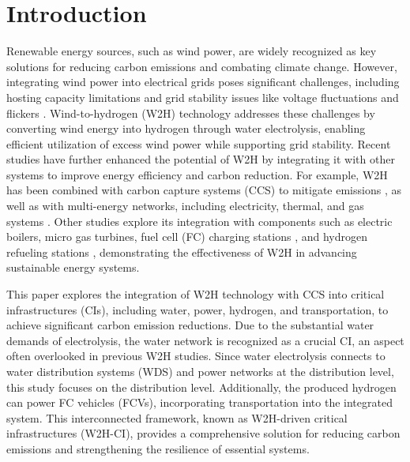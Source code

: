\documentclass[conference]{IEEEtran}
\begin{document}
\allowdisplaybreaks
\section{Introduction}   \label{sec: Intro}

Renewable energy sources, such as wind power, are widely recognized as key solutions for reducing carbon emissions and combating climate change. However, integrating wind power into electrical grids poses significant challenges, including hosting capacity limitations and grid stability issues like voltage fluctuations and flickers \cite{samet2020deep}. Wind-to-hydrogen (W2H) technology addresses these challenges by converting wind energy into hydrogen through water electrolysis, enabling efficient utilization of excess wind power while supporting grid stability. Recent studies have further enhanced the potential of W2H by integrating it with other systems to improve energy efficiency and carbon reduction. For example, W2H has been combined with carbon capture systems (CCS) to mitigate emissions \cite{samani2023optimal}, as well as with multi-energy networks, including electricity, thermal, and gas systems \cite{zhang2020environment}. Other studies explore its integration with components such as electric boilers, micro gas turbines, fuel cell (FC) charging stations \cite{li2021optimal}, and hydrogen refueling stations \cite{wu2020cooperative}, demonstrating the effectiveness of W2H in advancing sustainable energy systems.



This paper explores the integration of W2H technology with CCS into critical infrastructures (CIs), including water, power, hydrogen, and transportation, to achieve significant carbon emission reductions. Due to the substantial water demands of electrolysis, the water network is recognized as a crucial CI, an aspect often overlooked in previous W2H studies. Since water electrolysis connects to water distribution systems (WDS) and power networks at the distribution level, this study focuses on the distribution level. Additionally, the produced hydrogen can power FC vehicles (FCVs), incorporating transportation into the integrated system. This interconnected framework, known as W2H-driven critical infrastructures (W2H-CI), provides a comprehensive solution for reducing carbon emissions and strengthening the resilience of essential systems.
\end{document}
